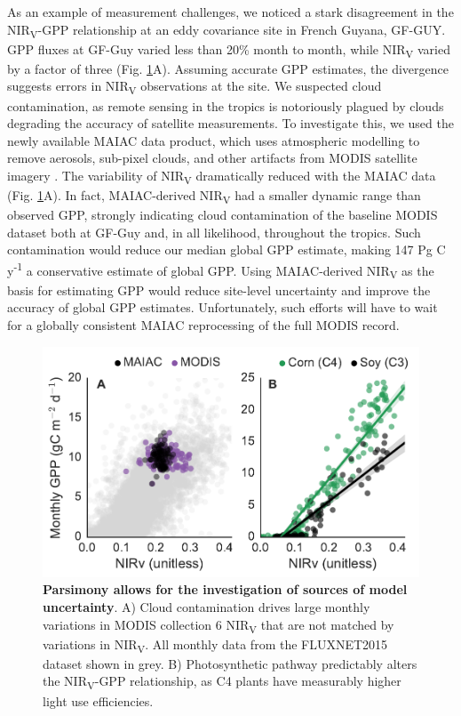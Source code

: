 \documentclass[10pt,letterpaper]{article}
\begin{document}
As an example of measurement challenges, we noticed a stark disagreement in the NIR\textsubscript{V}-GPP relationship at an eddy covariance site in French Guyana, GF-GUY. GPP fluxes at GF-Guy varied less than 20\% month to month, while NIR\textsubscript{V} varied by a factor of three (Fig. \ref{fig:parsimony_pluses}A). Assuming accurate GPP estimates, the divergence suggests errors in NIR\textsubscript{V} observations at the site. We suspected cloud contamination, as remote sensing in the tropics is notoriously plagued by clouds degrading the accuracy of satellite measurements. To investigate this, we used the newly available MAIAC data product, which uses atmospheric modelling to remove aerosols, sub-pixel clouds, and other artifacts from MODIS satellite imagery \cite{lyapustin2011multiangle}. The variability of NIR\textsubscript{V} dramatically reduced with the MAIAC data (Fig. \ref{fig:parsimony_pluses}A). In fact, MAIAC-derived NIR\textsubscript{V} had a smaller dynamic range than observed GPP, strongly indicating cloud contamination of the baseline MODIS dataset both at GF-Guy and, in all likelihood, throughout the tropics. Such contamination would reduce our median global GPP estimate, making 147 Pg C y\textsuperscript{-1} a conservative estimate of global GPP.  Using MAIAC-derived NIR\textsubscript{V} as the basis for estimating GPP would reduce site-level uncertainty and improve the accuracy of global GPP estimates. Unfortunately, such efforts will have to wait for a globally consistent MAIAC reprocessing of the full MODIS record.

\begin{figure}[h]
    \centering
    \includegraphics[width=11.4cm, keepaspectratio]{figure_parsimony.pdf}
    \caption{\textbf{Parsimony allows for the investigation of sources of model uncertainty}. A) Cloud contamination drives large monthly variations in MODIS collection 6 NIR\textsubscript{V} that are not matched by variations in NIR\textsubscript{V}. All monthly data from the FLUXNET2015 dataset shown in grey. B) Photosynthetic pathway predictably alters the NIR\textsubscript{V}-GPP relationship, as C4 plants have measurably higher light use efficiencies.}
    \label{fig:parsimony_pluses}
\end{figure}
\end{document}
